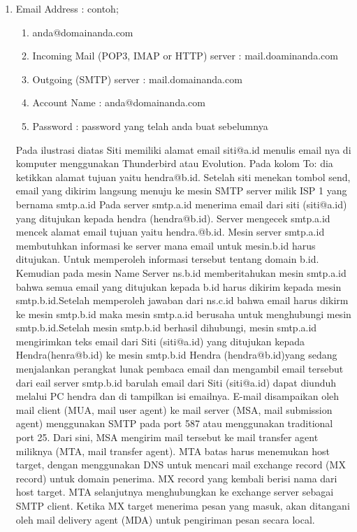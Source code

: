 \begin{enumerate}
\item Email Address : contoh; 
\begin{enumerate}
\item anda@domainanda.com 
\item Incoming Mail (POP3, IMAP or HTTP) server : mail.doaminanda.com 
\item Outgoing (SMTP) server : mail.domainanda.com 
\item Account Name : anda@domainanda.com 
\item Password : password yang telah anda buat sebelumnya
\end{enumerate} 
Pada ilustrasi diatas Siti memiliki alamat email siti@a.id menulis email nya di komputer menggunakan Thunderbird atau Evolution. Pada kolom To: dia ketikkan alamat tujuan yaitu hendra@b.id. Setelah siti menekan tombol send, email yang dikirim langsung menuju ke mesin SMTP server milik ISP 1 yang bernama smtp.a.id
Pada server smtp.a.id menerima email dari siti (siti@a.id) yang ditujukan kepada hendra (hendra@b.id). Server mengecek smtp.a.id mencek alamat email tujuan yaitu hendra.@b.id. Mesin server smtp.a.id membutuhkan informasi ke server mana email untuk mesin.b.id harus ditujukan. Untuk memperoleh informasi tersebut tentang domain b.id. 
Kemudian pada mesin Name Server ns.b.id memberitahukan mesin smtp.a.id bahwa semua email yang ditujukan kepada b.id harus dikirim kepada mesin smtp.b.id.Setelah memperoleh jawaban dari ns.c.id bahwa email harus dikirm ke mesin smtp.b.id maka mesin smtp.a.id berusaha untuk menghubungi mesin smtp.b.id.Setelah mesin smtp.b.id berhasil dihubungi, mesin smtp.a.id mengirimkan teks email dari Siti (siti@a.id) yang ditujukan kepada Hendra(henra@b.id) ke mesin smtp.b.id 
Hendra (hendra@b.id)yang sedang menjalankan perangkat lunak pembaca email dan mengambil email tersebut dari eail server smtp.b.id barulah email dari Siti (siti@a.id) dapat diunduh melalui PC hendra dan di tampilkan isi emailnya. 
E-mail disampaikan oleh mail client (MUA, mail user agent) ke mail server (MSA, mail submission agent) menggunakan SMTP pada port 587 atau menggunakan traditional port 25. Dari sini, MSA mengirim mail tersebut ke mail transfer agent miliknya (MTA, mail transfer agent). MTA batas harus menemukan host target, dengan menggunakan DNS untuk mencari mail exchange record (MX record) untuk domain penerima. MX record yang kembali berisi nama dari host target. MTA selanjutnya menghubungkan ke exchange server sebagai SMTP client. Ketika MX target menerima pesan yang masuk, akan ditangani oleh mail delivery agent (MDA) untuk pengiriman pesan secara local. 

\end{enumerate}
